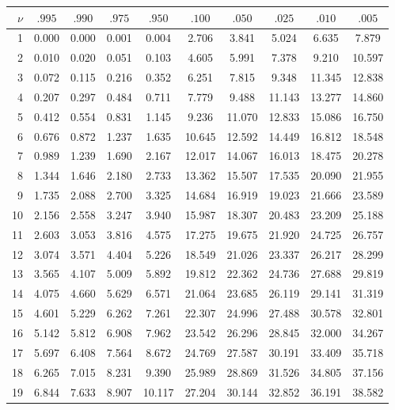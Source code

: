 \begin{center}
\small
\renewcommand{\arraystretch}{1.12}
\begin{tabular}{r|ccccccccc}
\hline
$\nu$ & $.995$ & $.990$ & $.975$ & $.950$ & $.100$ & $.050$ & $.025$ & $.010$ & $.005$ \\
\hline
1  & 0.000 & 0.000 & 0.001 & 0.004 &  2.706 &  3.841 &  5.024 &  6.635 &  7.879 \\
2  & 0.010 & 0.020 & 0.051 & 0.103 &  4.605 &  5.991 &  7.378 &  9.210 & 10.597 \\
3  & 0.072 & 0.115 & 0.216 & 0.352 &  6.251 &  7.815 &  9.348 & 11.345 & 12.838 \\
4  & 0.207 & 0.297 & 0.484 & 0.711 &  7.779 &  9.488 & 11.143 & 13.277 & 14.860 \\
5  & 0.412 & 0.554 & 0.831 & 1.145 &  9.236 & 11.070 & 12.833 & 15.086 & 16.750 \\
6  & 0.676 & 0.872 & 1.237 & 1.635 & 10.645 & 12.592 & 14.449 & 16.812 & 18.548 \\
7  & 0.989 & 1.239 & 1.690 & 2.167 & 12.017 & 14.067 & 16.013 & 18.475 & 20.278 \\
8  & 1.344 & 1.646 & 2.180 & 2.733 & 13.362 & 15.507 & 17.535 & 20.090 & 21.955 \\
9  & 1.735 & 2.088 & 2.700 & 3.325 & 14.684 & 16.919 & 19.023 & 21.666 & 23.589 \\
10 & 2.156 & 2.558 & 3.247 & 3.940 & 15.987 & 18.307 & 20.483 & 23.209 & 25.188 \\
11 & 2.603 & 3.053 & 3.816 & 4.575 & 17.275 & 19.675 & 21.920 & 24.725 & 26.757 \\
12 & 3.074 & 3.571 & 4.404 & 5.226 & 18.549 & 21.026 & 23.337 & 26.217 & 28.299 \\
13 & 3.565 & 4.107 & 5.009 & 5.892 & 19.812 & 22.362 & 24.736 & 27.688 & 29.819 \\
14 & 4.075 & 4.660 & 5.629 & 6.571 & 21.064 & 23.685 & 26.119 & 29.141 & 31.319 \\
15 & 4.601 & 5.229 & 6.262 & 7.261 & 22.307 & 24.996 & 27.488 & 30.578 & 32.801 \\
16 & 5.142 & 5.812 & 6.908 & 7.962 & 23.542 & 26.296 & 28.845 & 32.000 & 34.267 \\
17 & 5.697 & 6.408 & 7.564 & 8.672 & 24.769 & 27.587 & 30.191 & 33.409 & 35.718 \\
18 & 6.265 & 7.015 & 8.231 & 9.390 & 25.989 & 28.869 & 31.526 & 34.805 & 37.156 \\
19 & 6.844 & 7.633 & 8.907 & 10.117 & 27.204 & 30.144 & 32.852 & 36.191 & 38.582 \\

\end{tabular}
\end{center}
